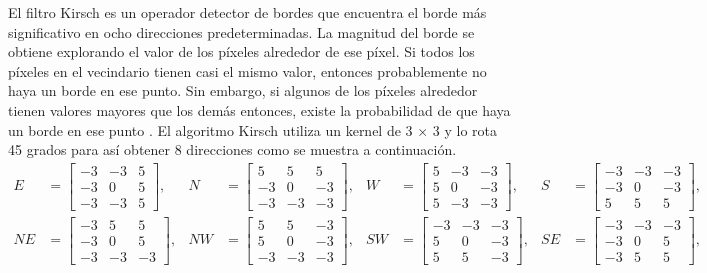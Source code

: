 \begin{onehalfspacing}
El filtro Kirsch es un operador detector de bordes que encuentra el borde más significativo en ocho direcciones predeterminadas. La magnitud del borde se obtiene explorando el valor de los píxeles alrededor de ese píxel. Si todos los píxeles en el vecindario tienen casi el mismo valor, entonces probablemente no haya un borde en ese punto. Sin embargo, si algunos de los píxeles alrededor tienen valores mayores que los demás entonces, existe la probabilidad de que haya un borde en ese punto \cite{Kalaiselvi2017ModifiedSegmentation}. El algoritmo Kirsch utiliza un kernel de 3 × 3 y  lo rota 45 grados para así obtener 8 direcciones como se muestra a continuación. 
\begin{align*}
E &= \begin{bmatrix}
-3 & -3 & 5 \\
-3 & 0 & 5 \\
-3 & -3 & 5 
\end{bmatrix},
& 
N &= \begin{bmatrix}
5 & 5 & 5 \\
-3 & 0 & -3 \\
-3 & -3 & -3
\end{bmatrix},
& 
W &= \begin{bmatrix}
5 & -3 & -3 \\
5 & 0 & -3 \\
5 & -3 & -3
\end{bmatrix},
&
S &= \begin{bmatrix}
-3 & -3 & -3 \\
-3 & 0 & -3 \\
5 & 5 & 5
\end{bmatrix},
&\\
NE &= \begin{bmatrix}
-3 & 5 & 5 \\
-3 & 0 & 5 \\
-3 & -3 & -3
\end{bmatrix},
&
NW &= \begin{bmatrix}
5 & 5 & -3 \\
5 & 0 & -3 \\
-3 & -3 & -3
\end{bmatrix},
&
SW &= \begin{bmatrix}
-3 & -3 & -3 \\
5 & 0 & -3 \\
5 & 5 & -3
\end{bmatrix},
&
SE &= \begin{bmatrix}
-3 & -3 & -3 \\
-3 & 0 & 5 \\
-3 & 5 & 5
\end{bmatrix},
\end{align*}



\end{onehalfspacing}
